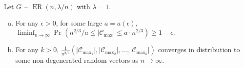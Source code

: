 \begin{lemma}\label{lma:component-of-regular-critical-Erdős-Rényi-graph}
	Let \(G \sim \operatorname{ER}(n, \lambda / n) \) with \(\lambda = 1\).
	\begin{enumerate}[(a)]
		\item\label{lma:component-of-regular-critical-Erdős-Rényi-graph-a} For any \(\epsilon > 0\), for some large \(a = a(\epsilon )\), \(\liminf_{n \to \infty} \Pr_{}\left( n^{2 / 3} / a \leq \lvert \mathcal{C} _{\max } \rvert \leq a \cdot n^{2 / 3} \right) \geq 1 - \epsilon\).
		\item\label{lma:component-of-regular-critical-Erdős-Rényi-graph-b} For any \(k>0\), \(\frac{1}{n^{2 / 3}} (\lvert \mathcal{C} _{\max _1} \rvert , \lvert \mathcal{C} _{\max _2} \rvert , \dots , \lvert \mathcal{C} _{\max _k} \rvert ) \) converges in distribution to some non-degenerated random vectors as \(n \to \infty \).
	\end{enumerate}
\end{lemma}

